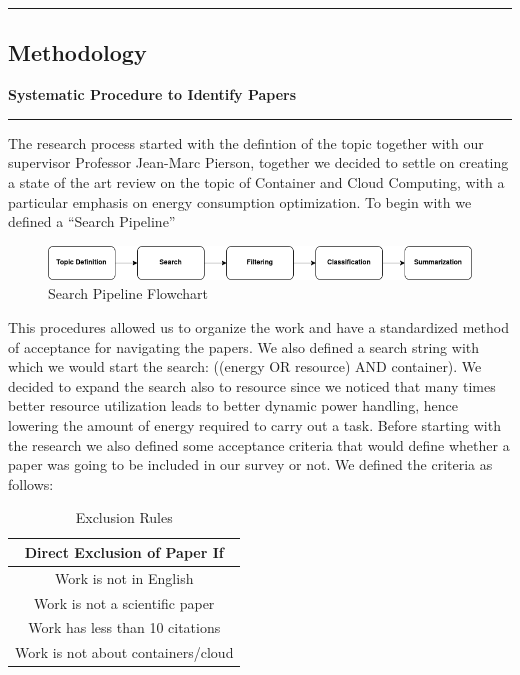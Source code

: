 {\color{gray}\hrule}
\begin{center}
\section{Methodology}
\textbf{Systematic Procedure to Identify Papers}
\bigskip
\end{center}
{\color{gray}\hrule}
\begin{multicols}{2}
The research process started with the defintion of the topic together with our supervisor Professor Jean-Marc Pierson, together we decided to settle on creating a state of the art review on the topic of Container and Cloud Computing, with a particular emphasis on energy consumption optimization. 
To begin with we defined a ``Search Pipeline''


\begin{figure}[H]
    \centering
    \includegraphics[width=\columnwidth]{flowchartTIR.png}
    \caption{Search Pipeline Flowchart}
    \label{fig:search_pipeline}
\end{figure}

This procedures allowed us to organize the work and have a standardized method of acceptance for navigating the papers. 
We also defined a search string with which we would start the search: ((energy OR resource) AND container).
We decided to expand the search also to resource since we noticed that many times better resource utilization leads to better dynamic power handling, hence lowering the amount of energy required to carry out a task.
Before starting with the research we also defined some acceptance criteria that would define whether a paper was going to be included in our survey or not. We defined the criteria as follows:



\begin{table}[H]
\centering
\begin{tabular}{c}
\hline
Direct Exclusion of Paper If \\ \hline
Work is not in English \\ 
Work is not a scientific paper \\ 
Work has less than 10 citations \\ 
Work is not about containers/cloud \\ \hline
\end{tabular}
    \caption{Exclusion Rules}
    \label{tab:Exclusion Rules}
\end{table}


\end{multicols}
